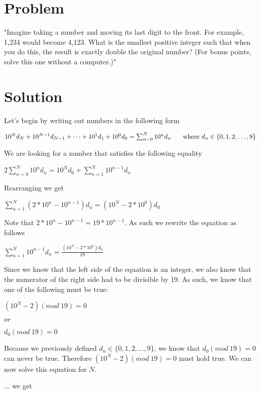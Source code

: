 \documentclass[a4paper,12pt]{article}
\begin{document}
\section{Problem}

"Imagine taking a number and moving its last digit to the front. 
For example, 1,234 would become 4,123. What is the smallest positive 
integer such that when you do this, the result is exactly double the 
original number? (For bonus points, solve this one without a 
computer.)"

\section{Solution}

Let's begin by writing out numbers in the following form\bigskip

$10^Nd_N+10^{N-1}d_{N-1}+\cdots+10^1d_1+10^0d_0=\sum^N_{n=0}10^nd_n 
\newline \indent \mbox{ where }d_n \in \{0,1,2,\ldots,9\}$\bigskip

\noindent We are looking for a number that satisfies the following 
equality\bigskip

$2\sum^N_{n=0}10^nd_n=10^Nd_0+\sum^N_{n=1}10^{n-1}d_n$\bigskip

\noindent Rearranging we get\bigskip

$\sum^N_{n=1}(2*10^n-10^{n-1})d_n=(10^N-2*10^0)d_0$\bigskip

\noindent Note that $2*10^n-10^{n-1}=19*10^{n-1}$.  As such we rewrite 
the equation as follows\bigskip

$\sum^N_{n=1}10^{n-1}d_n=\frac{(10^N-2*10^0)d_0}{19}$\bigskip

\noindent Since we know that the left side of the equation is an 
integer, we also know that the numerator of the right side had to be 
divisible by 19. As such, we know that one of the following must 
be true:
\bigskip

$(10^N-2)(mod \ 19) = 0$\bigskip

$or$\bigskip

$d_0(mod \ 19) = 0$\bigskip

\noindent Because we previously defined $d_n \in \{0,1,2,\ldots,9\}$\bigskip,
we know that $d_0(mod \ 19) = 0$ can never be true. Therefore $(10^N-2)(mod \ 19) = 0$ 
must hold true. We can now solve this equation for $N$.\bigskip

\bigskip

\noindent ... we get\bigskip
\end{document}
